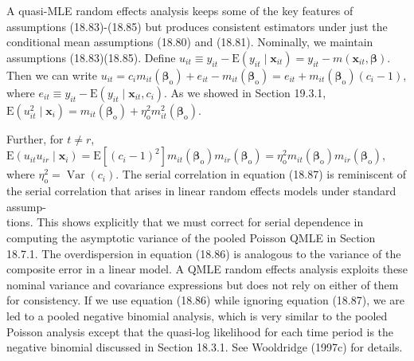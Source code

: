 \documentclass[10pt]{article}
\begin{document}
A quasi-MLE random effects analysis keeps some of the key features of assumptions (18.83)-(18.85) but produces consistent estimators under just the conditional mean assumptions (18.80) and (18.81). Nominally, we maintain assumptions (18.83)(18.85). Define $u_{i t} \equiv y_{i t}-\mathrm{E}\left(y_{i t} \mid \mathbf{x}_{i t}\right)=y_{i t}-m\left(\mathbf{x}_{i t}, \boldsymbol{\beta}\right)$. Then we can write $u_{i t}= c_{i} m_{i t}\left(\boldsymbol{\beta}_{\mathrm{o}}\right)+e_{i t}-m_{i t}\left(\boldsymbol{\beta}_{\mathrm{o}}\right)=e_{i t}+m_{i t}\left(\boldsymbol{\beta}_{\mathrm{o}}\right)\left(c_{i}-1\right)$, where $e_{i t} \equiv y_{i t}-\mathrm{E}\left(y_{i t} \mid \mathbf{x}_{i t}, c_{i}\right)$. As we showed in Section 19.3.1,\\
$\mathrm{E}\left(u_{i t}^{2} \mid \mathbf{x}_{i}\right)=m_{i t}\left(\boldsymbol{\beta}_{\mathrm{o}}\right)+\eta_{\mathrm{o}}^{2} m_{i t}^{2}\left(\boldsymbol{\beta}_{\mathrm{o}}\right)$.

Further, for $t \neq r$,\\
$\mathrm{E}\left(u_{i t} u_{i r} \mid \mathbf{x}_{i}\right)=\mathrm{E}\left[\left(c_{i}-1\right)^{2}\right] m_{i t}\left(\boldsymbol{\beta}_{\mathrm{o}}\right) m_{i r}\left(\boldsymbol{\beta}_{\mathrm{o}}\right)=\eta_{\mathrm{o}}^{2} m_{i t}\left(\boldsymbol{\beta}_{\mathrm{o}}\right) m_{i r}\left(\boldsymbol{\beta}_{\mathrm{o}}\right)$,\\
where $\eta_{\mathrm{o}}^{2}=\operatorname{Var}\left(c_{i}\right)$. The serial correlation in equation (18.87) is reminiscent of the serial correlation that arises in linear random effects models under standard assump-\\
tions. This shows explicitly that we must correct for serial dependence in computing the asymptotic variance of the pooled Poisson QMLE in Section 18.7.1. The overdispersion in equation (18.86) is analogous to the variance of the composite error in a linear model. A QMLE random effects analysis exploits these nominal variance and covariance expressions but does not rely on either of them for consistency. If we use equation (18.86) while ignoring equation (18.87), we are led to a pooled negative binomial analysis, which is very similar to the pooled Poisson analysis except that the quasi-log likelihood for each time period is the negative binomial discussed in Section 18.3.1. See Wooldridge (1997c) for details.
\end{document}
